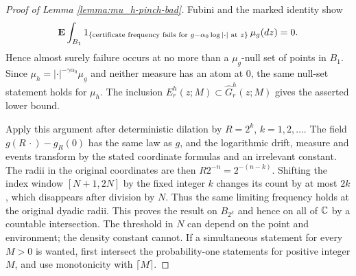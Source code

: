 \documentclass[12pt]{amsart}
\numberwithin{equation}{section}
\begin{document}
\begin{proof}[Proof of Lemma \ref{lemma:mu_h-pinch-bad}]
Fubini and the marked identity show
\[
 \mathop{\bf E{}}\int_{B_1}
 1_{\{\text{certificate frequency fails for }
              g-\alpha_0\log|\cdot|\text{ at }z\}}\,\mu_g(dz)=0.
\]
Hence almost surely failure occurs at no more than a
$\mu_g$-null set of points in $B_1$.
Since
$\mu_h=|\cdot|^{-\gamma\alpha_0}\mu_g$ and neither measure
has an atom at $0$, the same null-set statement holds for
$\mu_h$. The inclusion $E_r^h(z;M)\subset\widehat G_r^h(z;M)$
gives the asserted lower bound.

Apply this argument after deterministic dilation by
$R=2^k$, $k=1,2,\ldots$. The field
$g(R\,\cdot)-g_R(0)$ has the same law as $g$, and the
logarithmic drift, measure and events transform by the stated
coordinate formulas and an irrelevant constant.
The radii in the original coordinates are then
$R2^{-n}=2^{-(n-k)}$. Shifting the index window
$[N+1,2N]$ by the fixed integer $k$ changes its count by
at most $2k$, which disappears after division by $N$.
Thus the same limiting frequency holds at the original
dyadic radii. This proves the result on $B_{2^k}$ and hence on all of $\mathbb{C}$
by a countable intersection. The threshold in $N$ can depend
on the point and environment; the density constant cannot.
If a simultaneous statement for every $M>0$ is wanted, first
intersect the probability-one statements for positive integer
$M$, and use monotonicity with $\lceil M\rceil$.
\end{proof}

\end{document}
